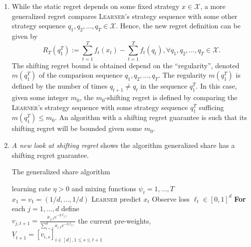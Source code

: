 \documentclass[a4paper, 12pt]{article}
\begin{document}
\begin{enumerate}
  \item While the static regret depends on some fixed strategy $x \in \mathscr{X}$, a more generalized regret compares \textsc{Learner}'s strategy sequence with some other strategy sequence $q_1, q_2, ..., q_T \in \mathscr{X}$. Hence, the new regret definition can be given by
        \[R_T(q_1^T) := \sum_{t=1}^T f_t(x_t) - \sum_{t=1}^T f_t(q_t), \forall q_1, q_2, ..., q_T \in \mathscr{X}.\]
        The shifting regret bound is obtained depend on the ``regularity'', denoted $m(q_1^T)$ of the comparison sequence $q_1, q_2, ..., q_T$. The regularity $m(q_1^T)$ is defined by the number of times $q_{t+1} \neq q_t$ in the sequence $q_1^T$. In this case, given some integer $m_0$, the $m_0$-shifting regret is defined by comparing the \textsc{Learner}'s strategy sequence with some strategy sequence $q_1^T$ sufficing $m(q_1^T) \leq m_0$. An algorithm with a shifting regret guarantee is such that its shifting regret will be bounded given some $m_0$.
  \item \textit{A new look at shifting regret}\cite{cesa2012new} shows the algorithm generalized share has a shifting regret guarantee.

        \begin{algorithm}
          \caption{The generalized share algorithm}\label{alg:gen}
          \begin{algorithmic}
            \Require learning rate $\eta > 0$ and mixing functions $\psi_t = 1, ..., T$
            \Ensure $x_1 = v_1 = (1/d, ..., 1/d)$
            \State \textsc{Learner} predict $x_t$
            \State Observe loss $\ell_t \in [0, 1]^d$
             \textbf{For} each $j=1, ..., d$ define \\
            $\displaystyle v_{j, t+1}=\frac{x_{j, t}e^{-\eta \ell_{j, t}}}{\sum_{i=1}^dx_{i, t}e^{-\eta \ell_{i, t}}}$ the current pre-weights, \\
            $\displaystyle \underline{V}_{t+1}=[v_{i, s}]_{i\in[d], 1\leq s \leq t+1}$
            \EndFor
          \end{algorithmic}
        \end{algorithm}


\end{enumerate}
\end{document}
